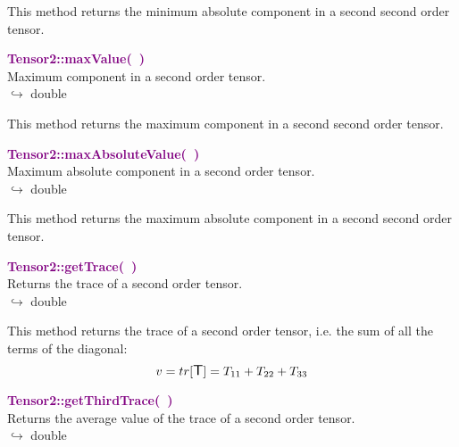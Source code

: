 This method returns the minimum absolute component in a second second order tensor.

\textcolor{purple}{\textbf{Tensor2::maxValue(~)}}\label{Tensor2::maxValue()}\\
Maximum component in a second order tensor.\\ \hspace*{10mm}$\hookrightarrow$ double

This method returns the maximum component in a second second order tensor.

\textcolor{purple}{\textbf{Tensor2::maxAbsoluteValue(~)}}\label{Tensor2::maxAbsoluteValue()}\\
Maximum absolute component in a second order tensor.\\ \hspace*{10mm}$\hookrightarrow$ double

This method returns the maximum absolute component in a second second order tensor.

\textcolor{purple}{\textbf{Tensor2::getTrace(~)}}\label{Tensor2::getTrace()}\\
Returns the trace of a second order tensor.\\ \hspace*{10mm}$\hookrightarrow$ double

  This method returns the trace of a second order tensor, i.e. the sum of all the terms of the diagonal:
\begin{equation*}
v = tr[\mbox{\large\ensuremath{\mathsf{T}}}] = T_{11}+T_{22}+T_{33}
\end{equation*}

\textcolor{purple}{\textbf{Tensor2::getThirdTrace(~)}}\label{Tensor2::getThirdTrace()}\\
Returns the average value of the trace of a second order tensor.\\ \hspace*{10mm}$\hookrightarrow$ double

